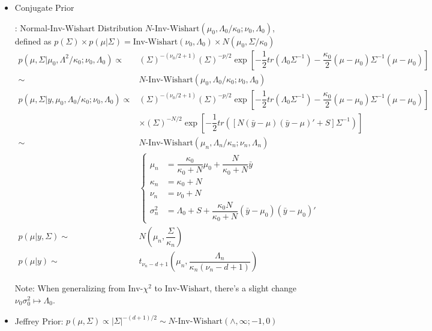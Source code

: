 \begin{itemize}[topsep=2pt,itemsep=0pt]
    \item \hypertarget{MultiNormalConjugate}{Conjugate Prior}: Normal-$ \mathrm{ Inv }  $-$ \mathrm{ Wishart }  $ Distribution $ N\text{-}\mathrm{ Inv }\text{-}\mathrm{ Wishart } (\mu _0, \Lambda _0/\kappa_0; \nu _0, \Lambda _0)  $, defined as $p(\Sigma )\times p(\mu |\Sigma )= \mathrm{ Inv }\text{-}\mathrm{ Wishart } (\nu _0,\Lambda _0)\times N(\mu _0, \Sigma /\kappa_0) $
    \begin{align}
        p(\mu ,\Sigma |\mu _0,\Lambda ^2/\kappa_0; \nu _0, \Lambda_0)\propto& (\Sigma )^{-(\nu_0/2+1)}(\Sigma )^{-p/2}\exp\left[ -\dfrac{ 1 }{ 2 } tr(\Lambda _0\Sigma ^{-1})-\dfrac{ \kappa _0 }{ 2 }(\mu -\mu _0)\Sigma ^{-1}(\mu -\mu _0)   \right]\\
        \sim & N\text{-}\mathrm{ Inv }\text{-}\mathrm{ Wishart } (\mu _0, \Lambda _0/\kappa_0; \nu _0, \Lambda_0)\\
        p(\mu ,\Sigma |y,\mu _0, \Lambda_0/\kappa_0; \nu _0, \Lambda_0)\propto&  (\Sigma )^{-(\nu_0/2+1)}(\Sigma )^{-p/2}\exp\left[ -\dfrac{ 1 }{ 2 } tr(\Lambda _0\Sigma ^{-1})-\dfrac{ \kappa _0 }{ 2 }(\mu -\mu _0)\Sigma ^{-1}(\mu -\mu _0)   \right] \\
        &\times (\Sigma )^{-N/2}\exp\left[ -\dfrac{ 1 }{ 2 } tr\left( [N(\bar{y}-\mu )(\bar{y}-\mu )' +S]\Sigma ^{-1} \right)  \right]\\
        \sim&N\text{-}\mathrm{ Inv }\text{-}\mathrm{ Wishart } (\mu _n, \Lambda _n/\kappa _n; \nu _n,\Lambda _n)\\
        & \begin{cases}
            \mu _n&=\dfrac{ \kappa _0 }{ \kappa _0+N } \mu _0+\dfrac{ N }{ \kappa _0+N } \bar{y}\\
            \kappa _n&=\kappa _0+N\\
            \nu _n&=\nu _0+N\\
            \sigma _n^2&=\Lambda _0+S+\dfrac{ \kappa _0N }{ \kappa _0+N }(\bar{y}-\mu _0)(\bar{y}-\mu _0)'
        \end{cases}\\
        p(\mu |y,\Sigma )\sim & N(\mu _n, \dfrac{ \Sigma  }{ \kappa _n } )\\
        p(\mu |y)\sim & t_{\nu _n-d+1}(\mu _n, \dfrac{ \Lambda _n }{ \kappa _n(\nu _n-d+1) } )
    \end{align}

    Note: When generalizing from $ \mathrm{ Inv }  $-$ \chi^2 $ to $ \mathrm{ Inv }  $-$ \mathrm{ Wishart }  $, there's a slight change $ \nu _0\sigma _0^2\mapsto \Lambda _0 $.

    \item Jeffrey Prior: $ p(\mu ,\Sigma )\propto |\Sigma |^{-(d+1)/2}\sim N\text{-}\mathrm{ Inv }\text{-}\mathrm{ Wishart }(\wedge, \infty; -1, 0) $
    
         

    
    
    
\end{itemize}





